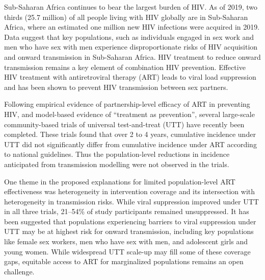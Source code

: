 Sub-Saharan Africa continues to bear the largest burden of HIV.
As of 2019, two thirds (25.7 million) of all people living with HIV globally are in Sub-Saharan Africa, where
an estimated one million new HIV infections were acquired in 2019.\cite{AIDSinfo}
Data suggest that key populations, such as individuals engaged in sex work and men who have sex with men experience
disproportionate risks of HIV acquisition and onward transmission in Sub-Saharan Africa.
\cite{Baral2012,Beyrer2012,Mishra2012,Boily2015}
HIV treatment to reduce onward transmission remains a key element of combination HIV prevention.\cite{WHO2016ART}
Effective HIV treatment with antiretroviral therapy (ART) leads to viral load suppression
and has been shown to prevent HIV transmission between sex partners.\cite{Lundgren2015,Danel2015,Cohen2016}
\par
Following empirical evidence of partnership-level efficacy of ART
in preventing HIV,\cite{Lundgren2015,Danel2015,Cohen2016}
and model-based evidence of ``treatment as prevention'',\cite{Granich2009,Eaton2012,Cori2014}
several large-scale community-based trials of universal test-and-treat (UTT)
have recently been completed.\cite{Iwuji2018,Havlir2019,Hayes2019}
These trials found that over 2 to 4 years,
cumulative incidence under UTT did not significantly differ from
cumulative incidence under ART according to national guidelines.\cite{Havlir2019,Hayes2019,Iwuji2018}
Thus the population-level reductions in incidence anticipated from transmission modelling
were not observed in the trials.\cite{Baral2019,Havlir2020}
\par
One theme in the proposed explanations for limited population-level ART effectiveness
was heterogeneity in intervention coverage and its intersection with
heterogeneity in transmission risks.\cite{AbdoolKarim2019,Baral2019}
While viral suppression improved under UTT in all three trials,
21--54\% of study participants remained unsuppressed.\cite{Iwuji2018,Havlir2019,Hayes2019}
It has been suggested that populations experiencing barriers to viral suppression under UTT
may be at highest risk for onward transmission, including key populations like
female sex workers, men who have sex with men, and adolescent girls and young women.%
\cite{Hakim2018,Nyato2019,Green2020}
While widespread UTT scale-up may fill some of these coverage gaps,
equitable access to ART for marginalized populations remains an open challenge.
